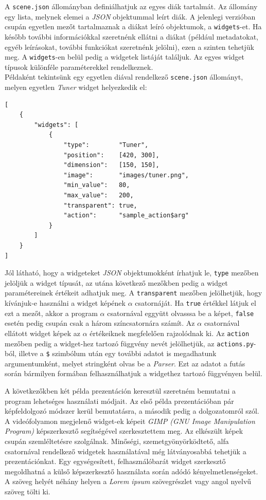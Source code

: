 A \texttt{scene.json} állományban definiálhatjuk az egyes diák tartalmát. Az állomány egy lista, melynek elemei a \textit{JSON} objektummal leírt diák. A jelenlegi verzióban csupán egyetlen mezőt tartalmaznak a diákat leíró objektumok, a \texttt{widgets}-et. Ha később további információkkal szeretnénk ellátni a diákat (például metadatokat, egyéb leírásokat, további funkciókat szeretnénk jelölni), ezen a szinten tehetjük meg. A \texttt{widgets}-en belül pedig a widgetek listáját találjuk. Az egyes widget típusok különféle paraméterekkel rendelkeznek.\\
Példaként tekintsünk egy egyetlen diával rendelkező \texttt{scene.json} állományt, melyen egyetlen \textit{Tuner} widget helyezkedik el:
\begin{verbatim}
[
    {
        "widgets": [
            {
                "type":        "Tuner",
                "position":    [420, 300],
                "dimension":   [150, 150],
                "image":       "images/tuner.png",
                "min_value":   80,
                "max_value":   200,
                "transparent": true,
                "action":      "sample_action$arg"
            }
        ]
    }
]
\end{verbatim}
Jól látható, hogy a widgeteket \textit{JSON} objektumokként írhatjuk le, \texttt{type} mezőben jelöljük a widget típusát, az utána következő mezőkben pedig a widget paramétereinek értékeit adhatjuk meg. A \texttt{transparent} mezőben jelölhetjük, hogy kívánjuk-e használni a widget képének $\alpha$ csatornáját. Ha \texttt{true} értékkel látjuk el ezt a mezőt, akkor a program $\alpha$ csatornával eggyütt olvasssa be a képet, \texttt{false} esetén pedig csupán csak a három színcsatornára számít. Az $\alpha$ csatornával ellátott widget képek az $\alpha$ értékeiknek megfelelően rajzolódnak ki.
Az \texttt{action} mezőben pedig a widget-hez tartozó függvény nevét jelölhetjük, az \texttt{actions.py}-ból, illetve a \texttt{\$} szimbólum után egy további adatot is megadhatunk argumentumként, melyet stringként olvas be a \textit{Parser}. Ezt az adatot a futás során bármilyen formában felhasználhatjuk a widgethez tartozó függvényen belül.

A következőkben két példa prezentáción keresztül szeretném bemutatni a program lehetséges használati módjait. Az első példa prezentációban pár képfeldolgozó módszer kerül bemutatásra, a második pedig a dolgozatomról szól.
A videófolyamon megjelenő widget-ek képeit \textit{GIMP (GNU Image Manipulation Program)} képszerkesztő segítségével szerkesztettem meg. Az elkészült képek csupán szemléltetésre szolgálnak. Minőségi, szemetgyönyörködtető, alfa csatornával rendelkező widgetek használatával még látványosabbá tehetjük a prezentációnkat. Egy egységesített, felhasználóbarát widget szerkesztő megoldhatná a külső képszerkesztő használata során adódó kényelmetlenségeket. A szöveg helyét néhány helyen a \textit{Lorem ipsum} szövegrészlet vagy angol nyelvű szöveg tölti ki.

